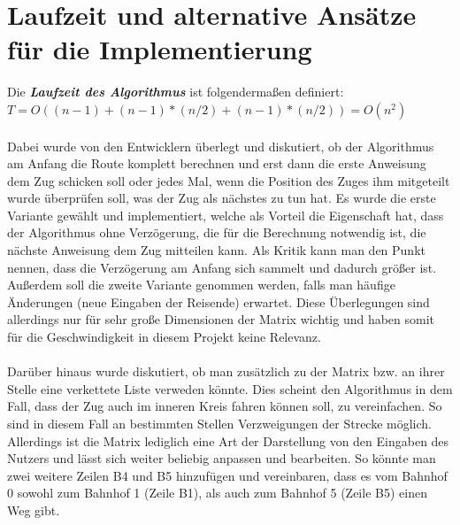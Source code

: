 \section{Laufzeit und alternative Ansätze für die Implementierung}
Die \textbf{\textit{Laufzeit des Algorithmus}} ist folgendermaßen definiert:\\
$T = O( (n-1) + (n-1)*(n/2) + (n-1)*(n/2) ) = O(n^2)$\\
\\
Dabei wurde von den Entwicklern überlegt und diskutiert, ob der Algorithmus am Anfang die Route komplett berechnen und erst dann die erste Anweisung dem Zug schicken soll oder jedes Mal, wenn die Position des Zuges ihm mitgeteilt wurde überprüfen soll, was der Zug als nächstes zu tun hat. Es wurde die erste Variante gewählt und implementiert, welche als Vorteil die Eigenschaft hat, dass der Algorithmus ohne Verzögerung, die für die Berechnung notwendig ist, die nächste Anweisung dem Zug mitteilen kann. Als Kritik kann man den Punkt nennen, dass die Verzögerung am Anfang sich sammelt und dadurch größer ist. Außerdem soll die zweite Variante genommen werden, falls man häufige Änderungen (neue Eingaben der Reisende) erwartet. Diese Überlegungen sind allerdings nur für sehr große Dimensionen der Matrix wichtig und haben somit für die Geschwindigkeit in diesem Projekt keine Relevanz.\\
\\
Darüber hinaus wurde diskutiert, ob man zusätzlich zu der Matrix bzw. an ihrer Stelle eine verkettete Liste verweden könnte. Dies scheint den Algorithmus in dem Fall, dass der Zug auch im inneren Kreis fahren können soll, zu vereinfachen. So sind in diesem Fall an bestimmten Stellen Verzweigungen der Strecke möglich. Allerdings ist die Matrix lediglich eine Art der Darstellung von den Eingaben des Nutzers und lässt sich weiter beliebig anpassen und bearbeiten. So könnte man zwei weitere Zeilen B4 und B5 hinzufügen und vereinbaren, dass es vom Bahnhof 0 sowohl zum Bahnhof 1 (Zeile B1), als auch zum Bahnhof 5 (Zeile B5) einen Weg gibt.\\
%
%
